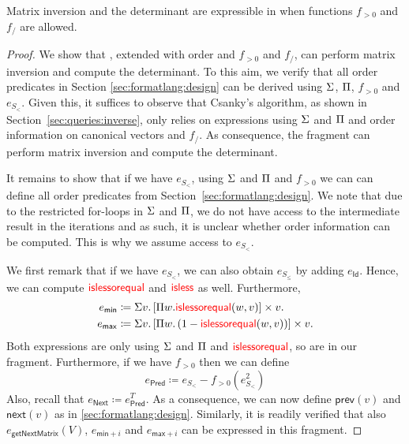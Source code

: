 %

\begin{proposition}
Matrix inversion and the determinant are expressible in  \langmprod{} when functions
$f_{>0}$ and $f_/$ are allowed.
\end{proposition}
\begin{proof}
We show that \langmprod, extended with order and $f_{>0}$ and $f_/$, 
can perform matrix inversion and compute the determinant. 
To this aim, we verify that all order
predicates in Section \ref{sec:formatlang:design} can be derived using $\Sigma$, $\Pi$, $f_{>0}$ and 
$e_{S_{<}}$. Given this, it suffices to observe that Csanky's algorithm, as shown in Section~\ref{sec:queries:inverse}, only relies on expressions using $\Sigma$ and $\Pi$ and order information on canonical vectors and $f_/$.
As consequence, the fragment can perform matrix inversion and compute the determinant.

It remains to show that if we have $e_{S_{<}}$, using $\Sigma$ and $\Pi$ and $f_{>0}$ we can
can define all order predicates from Section~\ref{sec:formatlang:design}. We note that due to the restricted for-loops
in $\Sigma$ and $\Pi$, we do not have access to the intermediate
result in the iterations and as such, it is unclear whether order information can be computed. This is why
we assume access to $e_{S_<}$.

We first remark that if we have $e_{S_{<}}$, we can also obtain
 $e_{S_{\leq}}$ by adding $e_{\mathsf{Id}}$. Hence,
we can compute ${\color{red} \mathsf{islessorequal}}$ and ${\color{red} \mathsf{isless}}$ as well. Furthermore, 
\begin{align*}
  e_{\mathsf{min}}&\coloneqq \Sigma v. \left[ \Pi w. {\color{red} \mathsf{islessorequal}}(w,v)\right] \times v. \\
  e_{\mathsf{max}}&\coloneqq \Sigma v. \left[ \Pi w. \left( 1-{\color{red} \mathsf{islessorequal}}(w,v) \right) \right] \times v.
\end{align*}
Both expressions are only using $\Sigma$ and $\Pi$ and ${\color{red} \mathsf{islessorequal}}$, so are in our fragment.
Furthermore, if we have $f_{>0}$ then we can define
$$
e_{\mathsf{Pred}}\coloneqq  e_{S_{<}}- f_{>0}(e_{S_{<}}^2)
$$
Also, recall that  $e_{\mathsf{Next}}\coloneqq e_{\mathsf{Pred}}^T$. As a consequence, 
we can now define $\mathsf{prev}(v)$ and $\mathsf{next}(v)$ as in \ref{sec:formatlang:design}. Similarly,
it is readily verified that also 
$e_{\mathsf{getNextMatrix}}(V)$, $e_{\mathsf{min}+i}$ and $e_{\mathsf{max}+i}$ can be expressed
in this fragment.
\end{proof}
